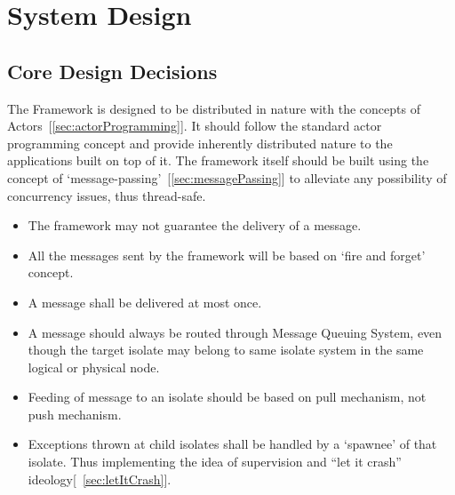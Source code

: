 \chapter{System Design}\label{chapter:general_design_decisions}

\section{Core Design Decisions}
The Framework is designed to be distributed in nature with the concepts of Actors~[\autoref{sec:actorProgramming}]. It should follow the standard actor programming concept and provide inherently distributed nature to the applications built on top of it. The framework itself should be built using the concept of ‘message-passing’~[\autoref{sec:messagePassing}] to alleviate any possibility of concurrency issues, thus thread-safe.

\begin{itemize}
  \item The framework may not guarantee the delivery of a message.
  \item All the messages sent by the framework will be based on ‘fire and forget’ concept.
  \item A message shall be delivered at most once.
  \item A message should always be routed through Message Queuing System, even though the target isolate may belong to same isolate system in the same logical or physical node.
  \item Feeding of message to an isolate should be based on pull mechanism, not push mechanism.
  \item Exceptions thrown at child isolates shall be handled by a ‘spawnee’ of that isolate. Thus implementing the idea of supervision and “let it crash” ideology[~\autoref{sec:letItCrash}].
\end{itemize}

